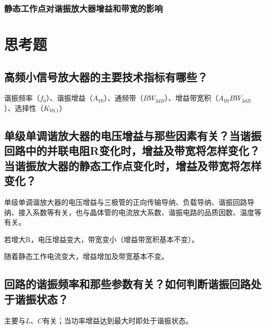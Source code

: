 \documentclass{../source/Experiment}
\begin{document}
            \subsubsection{静态工作点对谐振放大器增益和带宽的影响}

    \section{思考题}
	    \subsection{高频小信号放大器的主要技术指标有哪些？}
	
        谐振频率（$f_0$）、谐振增益（$A_{V0}$）、通频带（$BW_{3dB}$）、增益带宽积（$A_{V0}BW_{3dB}$）、选择性（$K_{V0.1}$）
        
        \subsection{单级单调谐放大器的电压增益与那些因素有关？当谐振回路中的并联电阻R变化时，增益及带宽将怎样变化？当谐振放大器的静态工作点变化时，增益及带宽将怎样变化？}
        
        单级单调谐放大器的电压增益与三极管的正向传输导纳、负载导纳、谐振回路导纳、接入系数等有关，也与晶体管的电流放大系数、谐振电路的品质因数、温度等有关。
        
        若增大R，电压增益变大，带宽变小（增益带宽积基本不变）。

        随着静态工作电流变大，增益增加及带宽基本不变。

        \subsection{回路的谐振频率和那些参数有关？如何判断谐振回路处于谐振状态？}
	
	    主要与$L$、$C$有关；当功率增益达到最大时即处于谐振状态。
	
\end{document}
